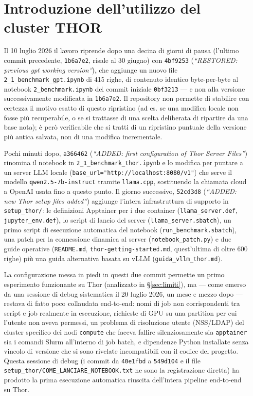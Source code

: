 \section{Introduzione dell'utilizzo del cluster THOR}
\label{sec:thor}

Il 10 luglio 2026 il lavoro riprende dopo una decina di giorni di pausa (l'ultimo commit precedente, \texttt{1b6a7e2}, risale al 30 giugno) con \texttt{4bf9253} (\emph{``RESTORED: previous gpt working version''}), che aggiunge un nuovo file \texttt{2\_1\_benchmark\_gpt.ipynb} di 415 righe, di contenuto identico byte-per-byte al notebook \texttt{2\_benchmark.ipynb} del commit iniziale \texttt{0bf3213} --- e non alla versione successivamente modificata in \texttt{1b6a7e2}. Il repository non permette di stabilire con certezza il motivo esatto di questo ripristino (ad es. se una modifica locale non fosse più recuperabile, o se si trattasse di una scelta deliberata di ripartire da una base nota); è però verificabile che si tratti di un ripristino puntuale della versione più antica salvata, non di una modifica incrementale.

Pochi minuti dopo, \texttt{a366462} (\emph{``ADDED: first configuration of Thor Server Files''}) rinomina il notebook in \texttt{2\_1\_benchmark\_thor.ipynb} e lo modifica per puntare a un server LLM locale (\texttt{base\_url="http://localhost:8080/v1"}) che serve il modello \texttt{qwen2.5-7b-instruct} tramite \texttt{llama.cpp}, sostituendo la chiamata cloud a OpenAI usata fino a questo punto. Il giorno successivo, \texttt{52cd3d8} (\emph{``ADDED: new Thor setup files added''}) aggiunge l'intera infrastruttura di supporto in \texttt{setup\_thor/}: le definizioni Apptainer per i due container (\texttt{llama\_server.def}, \texttt{jupyter\_env.def}), lo script di lancio del server (\texttt{llama\_server.sbatch}), un primo script di esecuzione automatica del notebook (\texttt{run\_benchmark.sbatch}), una patch per la connessione dinamica al server (\texttt{notebook\_patch.py}) e due guide operative (\texttt{README.md}, \texttt{thor-getting-started.md}, quest'ultima di oltre 600 righe) più una guida alternativa basata su vLLM (\texttt{guida\_vllm\_thor.md}).

La configurazione messa in piedi in questi due commit permette un primo esperimento funzionante su Thor (analizzato in \S\ref{sec:limiti}), ma --- come emerso da una sessione di debug sistematica il 20 luglio 2026, un mese e mezzo dopo --- restava di fatto poco collaudata end-to-end: nomi di job non corrispondenti tra script e job realmente in esecuzione, richieste di GPU su una partition per cui l'utente non aveva permessi, un problema di risoluzione utente (NSS/LDAP) del cluster specifico dei nodi \texttt{compute} che faceva fallire silenziosamente sia \texttt{apptainer} sia i comandi Slurm all'interno di job batch, e dipendenze Python installate senza vincolo di versione che si sono rivelate incompatibili con il codice del progetto. Questa sessione di debug (i commit da \texttt{40e1fbd} a \texttt{549d104} e il file \texttt{setup\_thor/COME\_LANCIARE\_NOTEBOOK.txt} ne sono la registrazione diretta) ha prodotto la prima esecuzione automatica riuscita dell'intera pipeline end-to-end su Thor.
